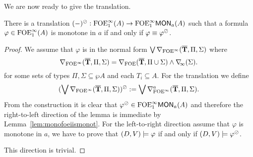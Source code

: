 \noindent We are now ready to give the translation.

\begin{lemma}
There is a translation $(-)^\tmono:\ofoei(A) \to \monot{\ofoei}{a}(A)$ such that
a formula ${\varphi \in \ofoei(A)}$ is monotone in $a$ if and only if $\varphi\equiv \varphi^\tmono$.
\end{lemma}
\begin{proof}
We assume that $\varphi$ is in the normal form $\bigvee \dbnfofoei{\vlist{T}}{\Pi}{\Sigma}$ where 
%
\[
\dbnfofoei{\vlist{T}}{\Pi}{\Sigma} = \dbnfofoe{\vlist{T}}{\Pi \cup \Sigma} \land \dbnfinf{\Sigma} .
\]
%
for some sets of types $\Pi,\Sigma \subseteq \wp A$ and each $T_i \subseteq A$.
%
For the translation we define
\[
(\bigvee \dbnfofoei{\vlist{T}}{\Pi}{\Sigma})^\tmono:= \bigvee \mondbnfofoei{\vlist{T}}{\Pi}{\Sigma}{a}.
\]
%
From the construction it is clear that $\varphi^\tmono \in \monot{\ofoei}{a}(A)$ and therefore the right-to-left direction of the lemma is immediate by Lemma~\ref{lem:monofoeiismonot}. For the left-to-right direction assume that $\varphi$ is monotone in $a$, we have to prove that $(D,\val) \models \varphi$ if and only if $(D,\val) \models \varphi^\tmono$.

\bigskip
\noindent \fbox{$\Rightarrow$} This direction is trivial.


\end{proof}
